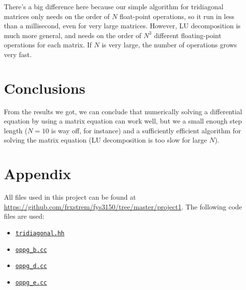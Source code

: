 \documentclass[12pt,a4paper]{article}
\begin{document}
There's a big difference here because our simple algorithm for tridiagonal matrices only needs on the order of $N$ float-point operations, so it run in less than a millisecond, even for very large matrices. However, LU decomposition is much more general, and needs on the order of $N^3$ different floating-point operations for each matrix. If $N$ is very large, the number of operations grows very fast.

\section{Conclusions}

From the results we got, we can conclude that numerically solving a differential equation by using a matrix equation can work well, but we a small enough step length ($N = 10$ is way off, for instance) and a sufficiently efficient algorithm for solving the matrix equation (LU decomposition is too slow for large $N$).

\clearpage
\appendix
\section{Appendix}

All files used in this project can be found at \url{https://github.com/frxstrem/fys3150/tree/master/project1}.
The following code files are used:
\begin{itemize}
  \item \href{https://github.com/frxstrem/fys3150/tree/master/project1/tridiagonal.hh}{\tt tridiagonal.hh}
  \item \href{https://github.com/frxstrem/fys3150/tree/master/project1/oppg_b.cc}{\tt oppg\_b.cc}
  \item \href{https://github.com/frxstrem/fys3150/tree/master/project1/oppg_d.cc}{\tt oppg\_d.cc}
  \item \href{https://github.com/frxstrem/fys3150/tree/master/project1/oppg_e.cc}{\tt oppg\_e.cc}
\end{itemize}

\clearpage

\printbibliography[heading=bibnumbered,title=Bibliography]
\end{document}
